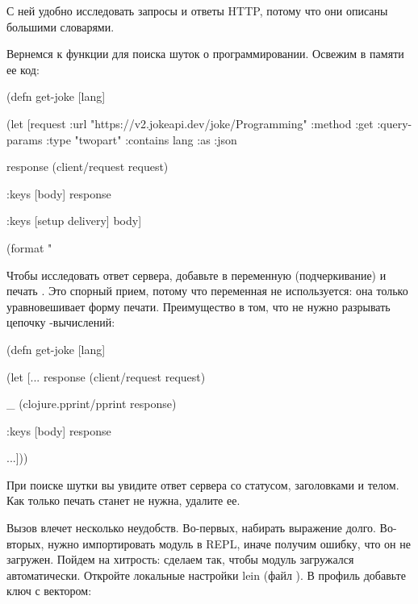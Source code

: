 С ней удобно исследовать запросы и ответы HTTP, потому что они описаны большими словарями.

Вернемся к функции  для поиска шуток о программировании. Освежим в памяти ее код:

\begin{english}
  \begin{clojure}
(defn get-joke [lang]

  (let [request
        {:url "https://v2.jokeapi.dev/joke/Programming"
         :method :get
         :query-params {:type "twopart" :contains lang}
         :as :json}

        response
        (client/request request)

        {:keys [body]}
        response

        {:keys [setup delivery]}
        body]

    (format "%
  \end{clojure}
\end{english}

Чтобы исследовать ответ сервера, добавьте в  переменную \code{\_} (подчеркивание) и печать  . Это спорный прием, потому что переменная \code{\_} не используется: она только уравновешивает форму печати. Преимущество в том, что не нужно разрывать цепочку -вычислений:

\begin{english}
  \begin{clojure}
(defn get-joke [lang]

  (let [...
        response
        (client/request request)

        _
        (clojure.pprint/pprint response)

        {:keys [body]}
        response

        ...]))
  \end{clojure}
\end{english}

При поиске шутки вы увидите ответ сервера со статусом, заголовками и телом. Как только печать станет не нужна, удалите ее.

Вызов  влечет несколько неудобств. Во-первых, набирать выражение  долго. Во-вторых, нужно импортировать модуль  в REPL, иначе получим ошибку, что он не загружен. Пойдем на хитрость: сделаем так, чтобы модуль загружался автоматически. Откройте локальные настройки lein (файл ). В профиль  добавьте ключ  с вектором:

